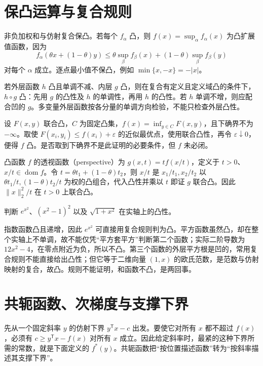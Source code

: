 \section{保凸运算与复合规则}

非负加权和与仿射复合保凸。若每个 $f_\alpha$ 凸，则 $f(x)=\sup_\alpha f_\alpha(x)$ 为凸扩展值函数，因为
\[
 f_\alpha(\theta x+(1-\theta)y)
 \leq\theta\sup_\beta f_\beta(x)+(1-\theta)\sup_\beta f_\beta(y)
\]
对每个 $\alpha$ 成立。逐点最小值不保凸，例如 $\min\{x,-x\}=-|x|$。

若外层函数 $h$ 凸且单调不减、内层 $g$ 凸，则在复合有定义且定义域凸的条件下，$h\circ g$ 凸：先用 $g$ 的凸性及 $h$ 的单调性，再用 $h$ 的凸性。若 $h$ 单调不增，则应配合凹的 $g$。多变量外层函数按各分量的单调方向检验，不能只检查外层凸性。

设 $F(x,y)$ 联合凸，$C$ 为固定凸集，$f(x)=\inf_{y\in C}F(x,y)$，且下确界不为 $-\infty$。取使 $F(x_i,y_i)\leq f(x_i)+\varepsilon$ 的近似最优点，使用联合凸性，再令 $\varepsilon\downarrow0$，便得 $f$ 凸。是否取到下确界不是此证明的必要条件，但 $f$ 未必闭。

凸函数 $f$ 的透视函数（perspective）为 $g(x,t)=t f(x/t)$，定义于 $t>0$、$x/t\in\operatorname{dom}f$。令 $t=\theta t_1+(1-\theta)t_2$，则 $x/t$ 是 $x_1/t_1,x_2/t_2$ 以 $\theta t_1/t,(1-\theta)t_2/t$ 为权的凸组合，代入凸性并乘以 $t$ 即证 $g$ 联合凸。因此 $\|x\|_2^2/t$ 在 $t>0$ 上联合凸。

\begin{example}[判断复合函数时先检查单调性]
判断 $e^{x^2}$、$(x^2-1)^2$ 以及 $\sqrt{1+x^2}$ 在实轴上的凸性。
\end{example}
\begin{solve}
指数函数凸且递增，因此 $e^{x^2}$ 可直接用复合规则判为凸。平方函数虽然凸，却在整个实轴上不单调，故不能仅凭“平方套平方”判断第二个函数；实际二阶导数为 $12x^2-4$，在零点附近为负，所以不凸。第三个函数的外层平方根是凹的，常用复合规则不能直接给出凸性；但它等于二维向量 $(1,x)$ 的欧氏范数，是范数与仿射映射的复合，故凸。规则不能证明，和函数不凸，是两回事。
\end{solve}

\section{共轭函数、次梯度与支撑下界}

先从一个固定斜率 $y$ 的仿射下界 $y^{\mathsf T}x-c$ 出发。要使它对所有 $x$ 都不超过 $f(x)$，必须有 $c\geq y^{\mathsf T}x-f(x)$ 对所有 $x$ 成立。因此给定斜率时，最紧的这种下界所需的常数，就是下面定义的 $f^*(y)$。共轭函数把“按位置描述函数”转为“按斜率描述其支撑下界”。

